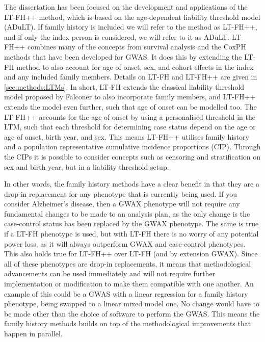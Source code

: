 The dissertation has been focused on the development and applications of the LT-FH++ method, which is based on the age-dependent liability threshold model (ADuLT). If family history is included we will refer to the method as LT-FH++, and if only the index person is considered, we will refer to it as ADuLT. LT-FH++ combines many of the concepts from survival analysis and the CoxPH methods that have been developed for GWAS. It does this by extending the LT-FH method to also account for age of onset, sex, and cohort effects in the index and any included family members. Details on LT-FH and LT-FH++ are given in \cref{sec:methods:LTMs}. In short, LT-FH extends the classical liability threshold model proposed by Falconer to also incorporate family members, and LT-FH++ extends the model even further, such that age of onset can be modelled too. The LT-FH++ accounts for the age of onset by using a personalised threshold in the LTM, such that each threshold for determining case status depend on the age or age of onset, birth year, and sex. This means LT-FH++ utilises family history and a population representative cumulative incidence proportions (CIP). Through the CIPs it is possible to consider concepts such as censoring and stratification on sex and birth year, but in a liability threshold setup.

In other words, the family history methods have a clear benefit in that they are a drop-in replacement for any phenotype that is currently being used. If you consider Alzheimer's disease, then a GWAX phenotype will not require any fundamental changes to be made to an analysis plan, as the only change is the case-control status has been replaced by the GWAX phenotype. The same is true if a LT-FH phenotype is used, but with LT-FH there is no worry of any potential power loss, as it will always outperform GWAX and case-control phenotypes. This also holds true for LT-FH++ over LT-FH (and by extension GWAX). Since all of these phenotypes are drop-in replacements, it means that methodological advancements can be used immediately and will not require further implementation or modification to make them compatible with one another. An example of this could be a GWAS with a linear regression for a family history phenotype, being swapped to a linear mixed model one. No change would have to be made other than the choice of software to perform the GWAS. This means the family history methods builds on top of the methodological improvements that happen in parallel.

